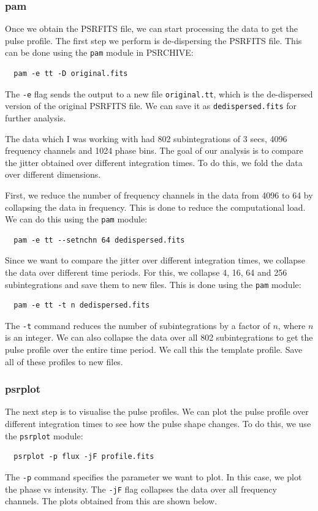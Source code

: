 \documentclass{article_saj}
\begin{document}
\subsubsection{pam}
Once we obtain the PSRFITS file, we can start processing the data to get the pulse profile. The first step we perform is de-dispersing the PSRFITS file. This can be done using the \texttt{pam} module in PSRCHIVE:
\begin{verbatim}
  pam -e tt -D original.fits
\end{verbatim}

The \texttt{-e} flag sends the output to a new file \texttt{original.tt}, which is the de-dispersed version of the original PSRFITS file. We can save it as \texttt{dedispersed.fits} for further analysis.

The data which I was working with had 802 subintegrations of 3 secs, 4096 frequency channels and 1024 phase bins. The goal of our analysis is to compare the jitter obtained over different integration times. To do this, we fold the data over different dimensions. 

First, we reduce the number of frequency channels in the data from 4096 to 64 by collapsing the data in frequency. This is done to reduce the computational load. We can do this using the \texttt{pam} module:
\begin{verbatim}
  pam -e tt --setnchn 64 dedispersed.fits
\end{verbatim} 

Since we want to compare the jitter over different integration times, we collapse the data over different time periods. For this, we collapse 4, 16, 64 and 256 subintegrations and save them to new files. This is done using the \texttt{pam} module:
\begin{verbatim}
  pam -e tt -t n dedispersed.fits
\end{verbatim}

The \texttt{-t} command reduces the number of subintegrations by a factor of $n$, where $n$ is an integer. We can also collapse the data over all 802 subintegrations to get the pulse profile over the entire time period. We call this the template profile. Save all of these profiles to new files.

\subsubsection{psrplot}
The next step is to visualise the pulse profiles. We can plot the pulse profile over different integration times to see how the pulse shape changes. To do this, we use the \texttt{psrplot} module:
\begin{verbatim}
  psrplot -p flux -jF profile.fits
\end{verbatim} 
The \texttt{-p} command specifies the parameter we want to plot. In this case, we plot the phase vs intensity. The \texttt{-jF} flag collapses the data over all frequency channels. The plots obtained from this are shown below.
\end{document}
